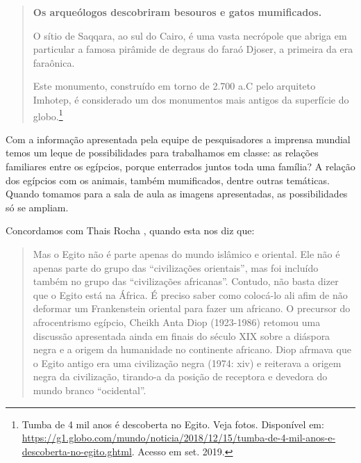 \begin{refsection}
\begin{quotation}
        \noindent\textbf{Os arqueólogos descobriram besouros e gatos mumificados.}

        \noindent{}O sítio de Saqqara, ao sul do Cairo, é uma vasta necrópole que abriga em particular a famosa pirâmide de degraus do faraó Djoser, a primeira da era faraônica. 

        Este monumento, construído em torno de 2.700 a.C pelo arquiteto Imhotep, é considerado um dos monumentos mais antigos da superfície do globo.\footnote{Tumba de 4 mil anos é descoberta no Egito. Veja fotos. Disponível em: \url{https://g1.globo.com/mundo/noticia/2018/12/15/tumba-de-4-mil-anos-e-descoberta-no-egito.ghtml}. Acesso em set. 2019.}
    \end{quotation}

    Com a informação apresentada pela equipe de pesquisadores a imprensa mundial temos um leque de possibilidades para trabalhamos em classe: as relações familiares entre os egípcios, porque enterrados juntos toda uma família? A relação dos egípcios com os animais, também mumificados, dentre outras temáticas. Quando tomamos para a sala de aula as imagens apresentadas, as possibilidades só se ampliam.  

    Concordamos com Thais Rocha \textcite[p.~187]{Silva2014Sorriso}, quando esta nos diz que: 

    \begin{quotation}
        Mas o Egito não é parte apenas do mundo islâmico e oriental. Ele não é apenas parte do grupo das ``civilizações orientais'', mas foi incluído também no grupo das ``civilizações africanas''. Contudo, não basta dizer que o Egito está na África. É preciso saber como colocá-lo ali afim de não deformar um Frankenstein oriental para fazer um africano. O precursor do afrocentrismo egípcio, Cheikh Anta Diop (1923-1986) retomou uma discussão apresentada ainda em finais do século XIX sobre a diáspora negra e a origem da humanidade no continente africano. Diop afrmava que o Egito antigo era uma civilização negra (1974: xiv) e reiterava a origem negra da civilização, tirando-a da posição de receptora e devedora do mundo branco ``ocidental''. 
    \end{quotation}


\end{refsection}

